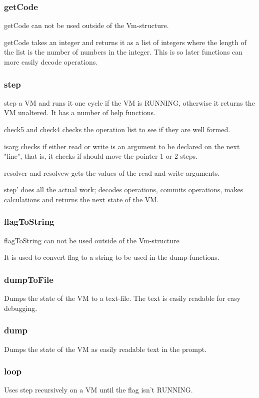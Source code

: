 \documentclass{article}
\begin{document}
\subsubsection{getCode}
getCode can not be used outside of the Vm-structure.

getCode takes an integer and returns it as a list of integers where the length of the list is the number of numbers in the integer. This is so later functions can more easily decode operations.

\subsubsection{step}
step a VM and runs it one cycle if the VM is RUNNING, otherwise it returns the VM unaltered. It has a number of help functions.

check5 and check4 checks the operation list to see if they are well formed.

isarg checks if either read or write is an argument to be declared on the next "line", that is, it checks if should move the pointer 1 or 2 steps.

resolver and resolvew gets the values of the read and write arguments.

step' does all the actual work; decodes operations, commits operations, makes calculations and returns the next state of the VM.

\subsubsection{flagToString}
flagToString can not be used outside of the Vm-structure

It is used to convert flag to a string to be used in the dump-functions.

\subsubsection{dumpToFile}
Dumps the state of the VM to a text-file. The text is easily readable for easy debugging.

\subsubsection{dump}
Dumps the state of the VM as easily readable text in the prompt.

\subsubsection{loop}
Uses step recursively on a VM until the flag isn't RUNNING.
\end{document}

